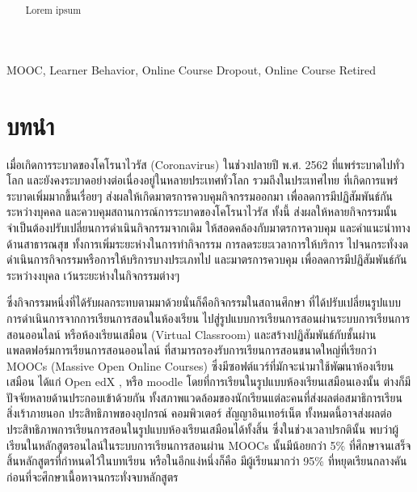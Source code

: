 \documentclass[conference]{IEEEtran}
\title{ \SNATopic }
\author{
    \IEEEauthorblockN{\Me} \newline
    \IEEEauthorblockA{\MyEmail} \newline
    \IEEEauthorblockA{ภาคการศึกษาที่ 2 ประจำปีการศึกษา 2563} \newline
    \IEEEauthorblockA{ภาควิชาวิทยาการคอมพิวเตอร์ คณะวิทยาศาสตร์} \newline
    \IEEEauthorblockA{มหาวิทยาลัยศรีนครินทรวิโรฒ ประสานมิตร}
}
\begin{document}
    \maketitle

    \begin{abstract}
        Lorem ipsum
    \end{abstract}

    \begin{IEEEkeywords}
        MOOC, Learner Behavior, Online Course Dropout, Online Course Retired
    \end{IEEEkeywords}

    \section{บทนำ}
    เมื่อเกิดการระบาดของโคโรนาไวรัส (Coronavirus) ในช่วงปลายปี พ.ศ. 2562 \cite{covid:coronavirus}
    ที่แพร่ระบาดไปทั่วโลก และยังคงระบาดอย่างต่อเนื่องอยู่ในหลายประเทศทั่วโลก \cite{covid:worldtrendspread}
    รวมถึงในประเทศไทย \cite{covid:thailandspread} ที่เกิดการแพร่ระบาดเพิ่มมากขึ้นเรื่อยๆ
    ส่งผลให้เกิดมาตรการควบคุมกิจกรรมออกมา เพื่อลดการมีปฏิสัมพันธ์กันระหว่างบุคคล 
    และควบคุมสถานการณ์การระบาดของโคโรนาไวรัส \cite{covid:ratchakitcha:22}
    ทั้งนี้ ส่งผลให้หลายกิจกรรมนั้นจำเป็นต้องปรับเปลี่ยนการดำเนินกิจกรรมจากเดิม
    ให้สอดคล้องกับมาตรการควบคุม และคำแนะนำทางด้านสาธารณสุข \cite{covid:socialdistancing} 
    ทั้งการเพิ่มระยะห่างในการทำกิจกรรม การลดระยะเวลาการให้บริการ 
    ไปจนกระทั่งงดดำเนินการกิจกรรมหรือการให้บริการบางประเภทไป 
    และมาตรการควบคุม เพื่อลดการมีปฏิสัมพันธ์กันระหว่างงบุคล เว้นระยะห่างในกิจกรรมต่างๆ 

    ซึ่งกิจกรรมหนึ่งที่ได้รับผลกระทบตามมาด้วยนั่นก็คือกิจกรรมในสถานศึกษา 
    ที่ได้ปรับเปลี่ยนรูปแบบการดำเนินการจากการเรียนการสอนในห้องเรียน 
    ไปสู่รูปแบบการเรียนการสอนผ่านระบบการเรียนการสอนออนไลน์ หรือห้องเรียนเสมือน
    (Virtual Classroom) และสร้างปฏิสัมพันธ์กับชั้นผ่านแพลตฟอร์มการเรียนการสอนออนไลน์
    ที่สามารถรองรับการเรียนการสอนขนาดใหญ่ที่เรียกว่า MOOCs (Massive Open Online Courses)
    ซึ่งมีซอฟต์แวร์ที่มักจะนำมาใช้พัฒนาห้องเรียนเสมือน ได้แก่ Open edX \cite{mooctools:openedx},
    หรือ moodle \cite{mooctools:moodle} โดยที่การเรียนในรูปแบบห้องเรียนเสมือนเองนั้น
    ต่างก็มีปัจจัยหลายด้านประกอบเข้าด้วยกัน 
    ทั้งสภาพแวดล้อมของนักเรียนแต่ละคนที่ส่งผลต่อสมาธิการเรียน สิ่งเร้าภายนอก
    ประสิทธิภาพของอุปกรณ์ คอมพิวเตอร์ สัญญาอินเทอร์เน็ต 
    ทั้งหมดนี้อาจส่งผลต่อประสิทธิภาพการเรียนการสอนในรูปแบบห้องเรียนเสมือนได้ทั้งสิ้น
    ซึ่งในช่วงเวลาปรกตินั้น พบว่าผู้เรียนในหลักสูตรอนไลน์ในระบบการเรียนการสอนผ่าน
    MOOCs นั้นมีน้อยกว่า 5\% ที่ศึกษาจนเสร็จสิ้นหลักสูตรที่กำหนดไว้ในบทเรียน \cite{Feng_Tang_Liu_2019}
    หรือในอีกแง่หนึ่งก็คือ มีผู้เรียนมากว่า 95\% 
    ที่หยุดเรียนกลางคันก่อนที่จะศึกษาเนื้อหาจนกระทั่งจบหลักสูตร
\end{document}
